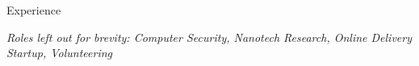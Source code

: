\documentclass{resume} %
\begin{document}
\begin{rSection}{Experience}








%

\em{Roles left out for brevity: Computer Security, Nanotech Research, Online Delivery Startup, Volunteering}
\end{rSection}
\end{document}
